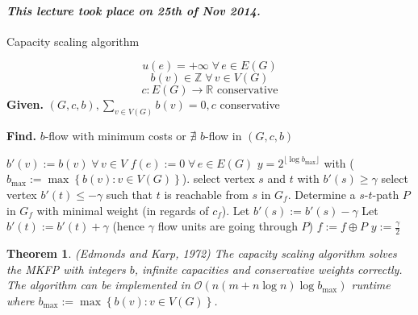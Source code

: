 \documentclass{article}
\newtheorem{theorem}{Theorem}
\newcommand{\set}[1]{\left\{#1\right\}}
\newcommand{\given}[1]{\textbf{Given.} #1\par}
\newcommand{\find}[1]{\textbf{Find.} #1\par}
\newcommand{\dateref}[1]{\paragraph{\textit{This lecture took place on #1.}}}
\newcommand{\gath}[2]{$#1$-$#2$-path} %
\newcommand{\fall}{\;\forall\,}
\begin{document}
\dateref{25th of Nov 2014}

\begin{algorithm}
  \caption{Capacity scaling algorithm}
  \label{min-b-flow-algo}
  \[ u(e) = +\infty \fall e \in E(G) \]
  \[ b(v) \in \mathbb{Z} \fall v \in V(G) \]
  \[ c: E(G) \rightarrow \mathbb{R} \text{ conservative} \]
  \given{$(G, c, b), \sum_{v \in V(G)} b(v) = 0, c$ conservative}
  \find{$b$-flow with minimum costs or $\nexists$ $b$-flow in $(G, c, b)$}
\begin{algorithmic}[1]
  \State $b'(v) := b(v) \fall v \in V$
  \State $f(e) := 0 \fall e \in E(G)$
    \State $y = 2^{\lfloor \log{b_{\text{max}}} \rfloor}$
      with ($b_{\text{max}} := \max\set{b(v) : v \in V(G)}$).
  \Else
     \State {}
  \EndIf
    \State {}
  \Else
    \State select vertex $s$ and $t$ with $b'(s) \geq \gamma$
    \State select vertex $b'(t) \leq -\gamma$ such that $t$ is reachable from $s$ in $G_f$.
      \State {}
    \EndIf
  \EndIf
  \State Determine a \gath st $P$ in $G_f$ with minimal weight (in regards of $c_f$).
  \State Let $b'(s) := b'(s) - \gamma$
  \State Let $b'(t) := b'(t) + \gamma$ (hence $\gamma$ flow units are going through $P$)
  \State $f := f \oplus P$
  \State {}
  \Else{}
    \State $y := \frac{\gamma}{2}$
    \State {}
  \EndIf
\end{algorithmic}
\end{algorithm}

\begin{theorem}\label{satz-5.11}
  (Edmonds and Karp, 1972)
  The capacity scaling algorithm solves the MKFP with integers $b$, infinite capacities and conservative weights correctly. The algorithm can be implemented in $\mathcal{O}(n (m + n \log{n}) \log{b_{\text{max}}})$ runtime where $b_{\text{max}} := \max\set{b(v): v \in V(G)}$.
\end{theorem}
\end{document}
